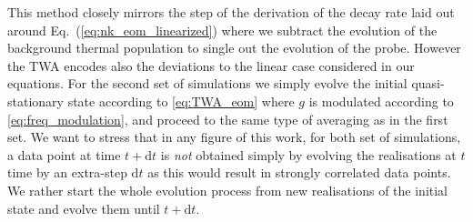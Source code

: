 \documentclass[aps,prd,notitlepage,amsfonts,amssymb,amsmath,nofootinbib,superscriptaddress,longbibliography]{revtex4-2}
\begin{document}
\begin{appendices}
This method closely mirrors the step of the derivation of the decay rate laid out around Eq.~(\ref{eq:nk_eom_linearized}) where we subtract the evolution of the background thermal population to single out the evolution of the probe. However the TWA encodes also the deviations to the linear case considered in our equations. 
For the second set of simulations we simply evolve the initial quasi-stationary state according to \eqref{eq:TWA_eom} where $g$ is modulated according to \eqref{eq:freq_modulation}, and proceed to the same type of averaging as in the first set. 
We want to stress that in any figure of this work, for both set of simulations, a data point at time $t + \mathrm{d}t$ is \textit{not} obtained simply by evolving the realisations at $t$ time by an extra-step $\mathrm{d}t$ as this would result in strongly correlated data points. We rather start the whole evolution process from new realisations of the initial state and evolve them until $t + \mathrm{d}t$.


\end{appendices}
\end{document}
